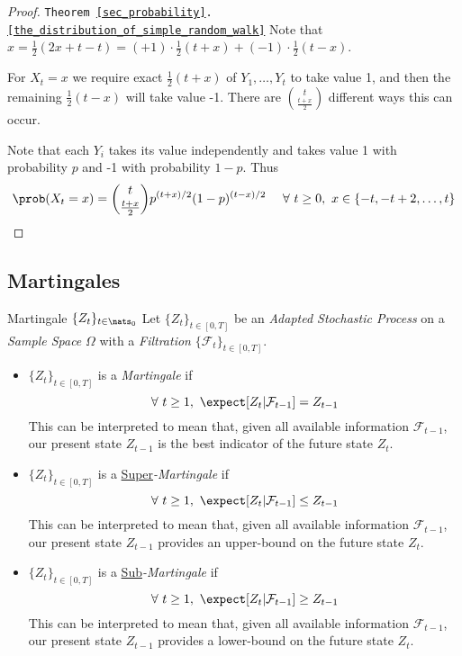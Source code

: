\documentclass[11pt,a4paper]{article}
\begin{document}
  \begin{proof}{\texttt{Theorem \ref{sec_probability}.\ref{the_distribution_of_simple_random_walk}}}
    Note that $x=\frac12(2x+t-t)=(+1)\cdot\frac12(t+x)+(-1)\cdot\frac12(t-x)$.
    \par For $X_t=x$ we require exact $\frac12(t+x)$ of $Y_1,\dots,Y_t$ to take value 1, and then the remaining $\frac12(t-x)$ will take value -1. There are ${t\choose{\frac{t+x}2}}$ different ways this can occur.
    \par Note that each $Y_i$ takes its value independently and takes value 1 with probability $p$ and -1 with probability $1-p$. Thus
    \[ \prob(X_t=x)={t \choose {\frac{t+x}2}}p^{(t+x)/2}(1-p)^{(t-x)/2}\quad\ \forall\ t\geq0,\ x\in\{-t,-t+2,\dots,t\} \]
  \end{proof}

\subsection{Martingales}

  \begin{definition}{Martingale $\{Z_t\}_{t\in\nats_0}$}
    Let $\{Z_t\}_{t\in[0,T]}$ be an \textit{Adapted Stochastic Process} on a \textit{Sample Space} $\Omega$ with a \textit{Filtration} $\{\mathcal{F}_t\}_{t\in[0,T]}$.
    \begin{itemize}
      \item $\{Z_t\}_{t\in[0,T]}$ is a \textit{Martingale} if
      \[ \forall\ t\geq1,\ \expect[Z_t|\mathcal{F}_{t-1}]=Z_{t-1} \]
      This can be interpreted to mean that, given all available information $\mathcal{F}_{t-1}$, our present state $Z_{t-1}$ is the best indicator of the future state $Z_t$.
      \item $\{Z_t\}_{t\in[0,T]}$ is a \underline{Super}\textit{-Martingale} if
      \[ \forall\ t\geq1,\ \expect[Z_t|\mathcal{F}_{t-1}]\leq Z_{t-1} \]
      This can be interpreted to mean that, given all available information $\mathcal{F}_{t-1}$, our present state $Z_{t-1}$ provides an upper-bound on the future state $Z_t$.
      \item $\{Z_t\}_{t\in[0,T]}$ is a \underline{Sub}\textit{-Martingale} if
      \[ \forall\ t\geq1,\ \expect[Z_t|\mathcal{F}_{t-1}]\geq Z_{t-1} \]
      This can be interpreted to mean that, given all available information $\mathcal{F}_{t-1}$, our present state $Z_{t-1}$ provides a lower-bound on the future state $Z_t$.
    \end{itemize}
  \end{definition}
\end{document}
